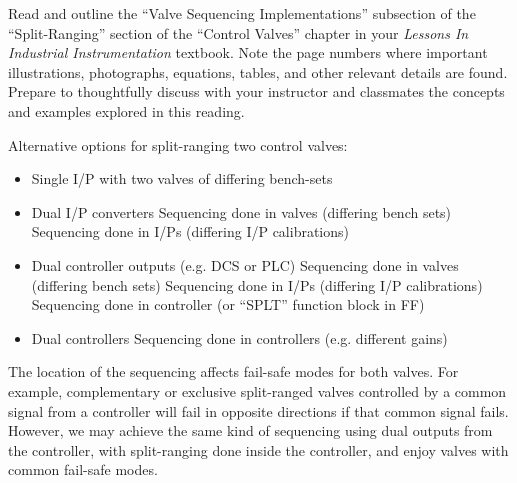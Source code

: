 

Read and outline the ``Valve Sequencing Implementations'' subsection of the ``Split-Ranging'' section of the ``Control Valves'' chapter in your {\it Lessons In Industrial Instrumentation} textbook.  Note the page numbers where important illustrations, photographs, equations, tables, and other relevant details are found.  Prepare to thoughtfully discuss with your instructor and classmates the concepts and examples explored in this reading.














Alternative options for split-ranging two control valves:

\begin{itemize}
\item{} Single I/P with two valves of differing bench-sets 
\item{} Dual I/P converters 
\itemitem{} Sequencing done in valves (differing bench sets)
\itemitem{} Sequencing done in I/Ps (differing I/P calibrations)
\item{} Dual controller outputs (e.g. DCS or PLC) 
\itemitem{} Sequencing done in valves (differing bench sets)
\itemitem{} Sequencing done in I/Ps (differing I/P calibrations)
\itemitem{} Sequencing done in controller (or ``SPLT'' function block in FF)
\item{} Dual controllers 
\itemitem{} Sequencing done in controllers (e.g. different gains)
\end{itemize}

\vskip 10pt

The location of the sequencing affects fail-safe modes for both valves.  For example, complementary or exclusive split-ranged valves controlled by a common signal from a controller will fail in opposite directions if that common signal fails.  However, we may achieve the same kind of sequencing using dual outputs from the controller, with split-ranging done inside the controller, and enjoy valves with common fail-safe modes.











